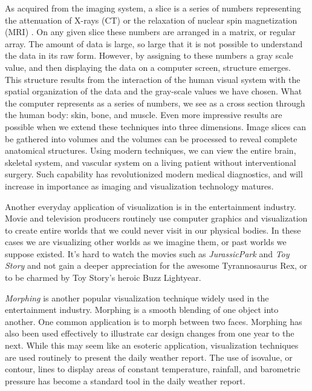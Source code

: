 As acquired from the imaging system, a slice is a series of numbers representing the attenuation of X-rays (CT) or the relaxation of nuclear spin magnetization (MRI) \cite{Krestel90}. On any given slice these numbers are arranged in a matrix, or regular array. The amount of data is large, so large that it is not possible to understand the data in its raw form. However, by assigning to these numbers a gray scale value, and then displaying the data on a computer screen, structure emerges. This structure results from the interaction of the human visual system with the spatial organization of the data and the gray-scale values we have chosen. What the computer represents as a series of numbers, we see as a cross section through the human body: skin, bone, and muscle. Even more impressive results are possible when we extend these techniques into three dimensions. Image slices can be gathered into volumes and the volumes can be processed to reveal complete anatomical structures. Using modern techniques, we can view the entire brain, skeletal system, and vascular system on a living patient without interventional surgery. Such capability has revolutionized modern medical diagnostics, and will increase in importance as imaging and visualization technology matures.

Another everyday application of visualization is in the entertainment industry. Movie and television producers routinely use computer graphics and visualization to create entire worlds that we could never visit in our physical bodies. In these cases we are visualizing other worlds as we imagine them, or past worlds we suppose existed. It's hard to watch the movies such as \emph{JurassicPark} and \emph{Toy Story} and not gain a deeper appreciation for the awesome Tyrannosaurus Rex, or to be charmed by Toy Story's heroic Buzz Lightyear.

\emph{Morphing} is another popular visualization technique widely used in the entertainment industry. Morphing is a smooth blending of one object into another. One common application is to morph between two faces. Morphing has also been used effectively to illustrate car design changes from one year to the next. While this may seem like an esoteric application, visualization techniques are used routinely to present the daily weather report. The use of isovalue, or contour, lines to display areas of constant temperature, rainfall, and barometric pressure has become a standard tool in the daily weather report.

